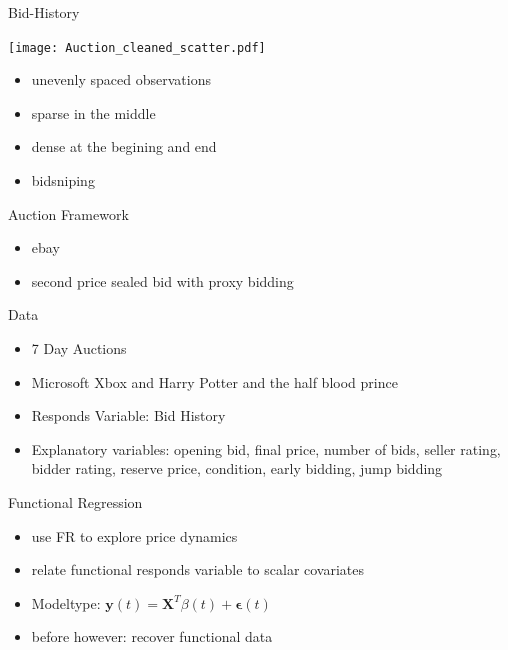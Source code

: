 \documentclass[hyperref={pdfpagelabels=false}]{beamer}
\begin{document}
\begin{frame}{Bid-History} %
\begin{minipage}[c]{0.65\textwidth}
\texttt{[image: Auction\_cleaned\_scatter.pdf]}
\end{minipage}
\hfill
\begin{minipage}[c]{0.3\textwidth}
\begin{itemize}
\item unevenly spaced observations
\item sparse in the middle
\item dense at the begining and end
\item bidsniping
\end{itemize}
\end{minipage}
\end{frame}

\begin{frame}{Auction Framework} %
\begin{itemize}
	\item ebay
	\item second price sealed bid with proxy bidding
\end{itemize}
Data
\begin{itemize}
	\item 7 Day Auctions
	\item Microsoft Xbox and Harry Potter and the half blood prince
	\item Responds Variable: Bid History
	\item Explanatory variables: opening bid, final price, number of bids, seller rating, bidder rating, reserve price, condition, early bidding, jump bidding
\end{itemize}
\end{frame}

\begin{frame}{Functional Regression}
\begin{itemize}
	\item use FR to explore price dynamics
	\item relate functional responds variable to scalar covariates
	\item Modeltype: $\mathbf{y}(t)=\mathbf{X}^T\beta(t)+\mathbf{\epsilon}(t)$ %
	\item before however: recover functional data
\end{itemize}
\end{frame}
\end{document}
